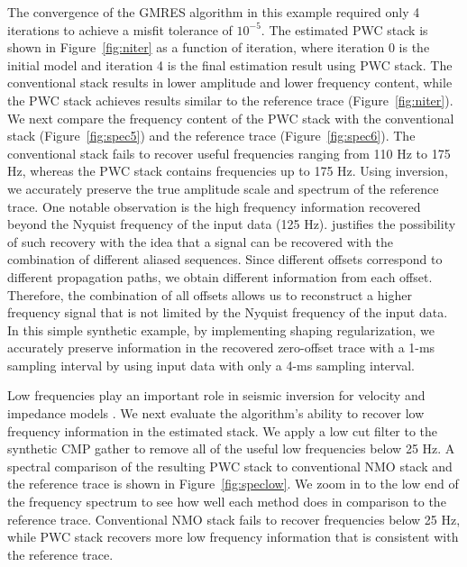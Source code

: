 The convergence of the GMRES algorithm in this example required only 4 iterations to achieve a misfit tolerance 
of $10^{-5}$. The estimated PWC stack is shown in Figure~\ref{fig:niter} as a function of iteration, where iteration 0 is the initial model
and iteration 4 is the final estimation result using PWC stack. The conventional stack
results in lower amplitude and lower frequency content, while the PWC stack achieves results similar to the reference trace (Figure~\ref{fig:niter}).
We next compare the frequency content of the PWC stack with the conventional stack (Figure~\ref{fig:spec5}) and the 
reference trace (Figure~\ref{fig:spec6}). The conventional stack fails to recover useful frequencies ranging 
from 110 Hz to 175 Hz, whereas the PWC stack contains frequencies up to 175 Hz. Using inversion, we 
accurately preserve the true amplitude scale and spectrum of the reference trace.
One notable observation is the high frequency information recovered beyond
the Nyquist frequency of the input data (125 Hz). \cite{ronen2} justifies the possibility of such recovery with the
idea that a signal can be recovered with the combination of different aliased sequences. Since different offsets
correspond to different propagation paths, we obtain different information from each offset. Therefore,
the combination of all offsets allows us to reconstruct a higher frequency signal that is not limited
by the Nyquist frequency of the input data. In this simple synthetic example, by implementing shaping 
regularization, we accurately preserve information in the recovered zero-offset trace with a 1-ms sampling 
interval by using input data with only a 4-ms sampling interval. 




Low frequencies play an important role in seismic inversion for velocity and impedance models \cite[]{kroode}.
We next evaluate the algorithm's ability to recover low frequency information in the 
estimated stack. We apply a low cut filter to the synthetic CMP gather to remove all of the useful low frequencies below 25 Hz.
A spectral comparison of the resulting PWC stack to conventional NMO stack
and the reference trace is shown in Figure~\ref{fig:speclow}. We zoom in to the low end of the frequency spectrum
to see how well each method does in comparison to the reference trace. Conventional NMO stack fails
to recover frequencies below 25 Hz, while PWC stack recovers more low frequency information that is consistent with the reference trace. 


